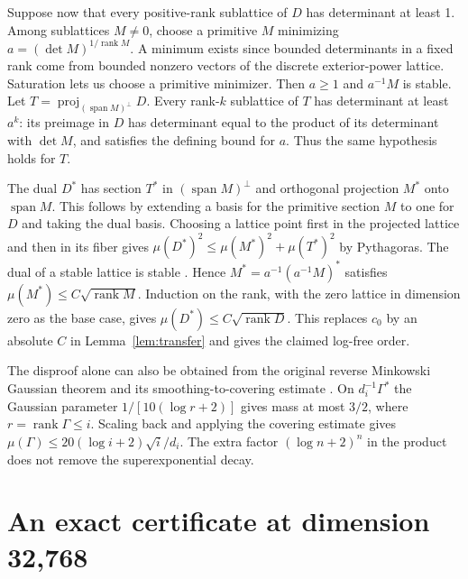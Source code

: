 \documentclass[11pt]{article}
\newcommand{\rk}{\operatorname{rank}}
\newcommand{\proj}{\operatorname{proj}}
\begin{document}
Suppose now that every positive-rank sublattice of \(D\) has
determinant at least 1. Among sublattices \(M\ne 0\), choose a
primitive \(M\) minimizing \(a=(\det M)^{1/\rk M}\). A minimum
exists since bounded determinants in a fixed rank come from
bounded nonzero vectors of the discrete exterior-power lattice.
Saturation lets us choose a primitive minimizer. Then \(a\ge1\)
and \(a^{-1}M\) is stable. Let \(T=\proj_{(\operatorname{span}M)^\perp}D\).
Every rank-\(k\) sublattice of \(T\) has determinant at least \(a^k\):
its preimage in \(D\) has determinant equal to the product of its
determinant with \(\det M\), and satisfies the defining bound for \(a\).
Thus the same hypothesis holds for \(T\).

The dual \(D^*\) has section \(T^*\) in \((\operatorname{span}M)^\perp\)
and orthogonal projection \(M^*\) onto \(\operatorname{span}M\).
This follows by extending a basis for the primitive section \(M\)
to one for \(D\) and taking the dual basis. Choosing a lattice point
first in the projected lattice and then in its fiber gives
\(\mu(D^*)^2\le\mu(M^*)^2+\mu(T^*)^2\) by Pythagoras.
The dual of a stable lattice is stable \cite[Prop.~2.5]{RSD}.
Hence \(M^*=a^{-1}(a^{-1}M)^*\) satisfies
\(\mu(M^*)\le C\sqrt{\rk M}\). Induction on the rank, with the zero
lattice in dimension zero as the base case, gives
\(\mu(D^*)\le C\sqrt{\rk D}\). This replaces \(c_0\) by an absolute
\(C\) in Lemma~\ref{lem:transfer} and gives the claimed log-free order.

The disproof alone can also be obtained from the original reverse
Minkowski Gaussian theorem and its smoothing-to-covering estimate
\cite[Thm.~1.2 and Lemma~6.1]{RSD}. On \(d_i^{-1}\Gamma^*\) the
Gaussian parameter \(1/[10(\log r+2)]\) gives mass at most \(3/2\),
where \(r=\rk\Gamma\le i\). Scaling back and applying the covering
estimate gives \(\mu(\Gamma)\le20(\log i+2)\sqrt i/d_i\).
The extra factor \((\log n+2)^n\) in the product does not remove
the superexponential decay.

\section{An exact certificate at dimension 32,768}\label{sec:finite}
\end{document}
